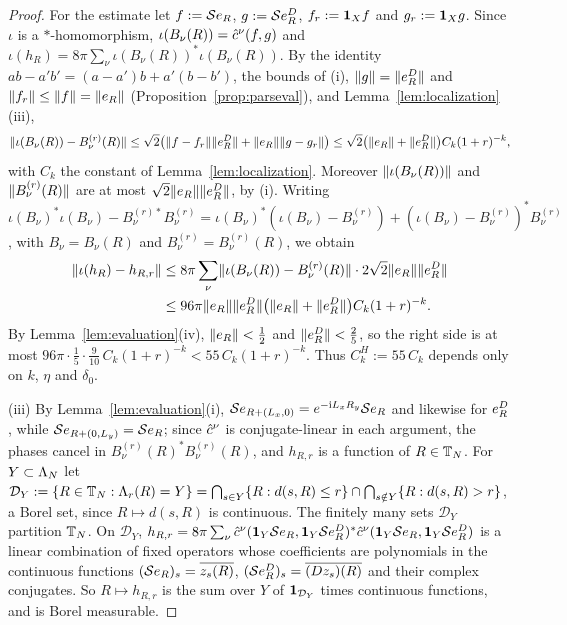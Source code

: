 \begin{proof}
For the estimate let $f:=\mathcal{S}e_{R}$, $g:=\mathcal{S}e^{D}_{R}$, $f_r:=\mathbf{1}_Xf$ and $g_r:=\mathbf{1}_Xg$. Since $\iota$ is a
$*$-homomorphism, $\iota(B_\nu(R))=\hat{c}^{\nu}(f,g)$ and $\iota(h_R)=8\pi\sum_\nu\iota(B_\nu(R))^*\iota(B_\nu(R))$. By the
identity $ab-a'b'=(a-a')b+a'(b-b')$, the bounds of (i), $\lVert g\rVert=\lVert e^{D}_{R}\rVert$ and $\lVert f_r\rVert\le\lVert f\rVert=\lVert e_{R}\rVert$
(Proposition~\ref{prop:parseval}), and Lemma~\ref{lem:localization}(iii),
\[
\lVert\iota(B_\nu(R))-B^{(r)}_\nu(R)\rVert\le\sqrt2\bigl(\lVert f-f_r\rVert\lVert e^{D}_{R}\rVert+\lVert e_{R}\rVert\lVert g-g_r\rVert\bigr)
\le\sqrt2\bigl(\lVert e_{R}\rVert+\lVert e^{D}_{R}\rVert\bigr)C_k(1+r)^{-k},
\]
with $C_k$ the constant of Lemma~\ref{lem:localization}. Moreover $\lVert\iota(B_\nu(R))\rVert$ and $\lVert B^{(r)}_\nu(R)\rVert$ are at
most $\sqrt2\lVert e_{R}\rVert\lVert e^{D}_{R}\rVert$, by (i). Writing
$\iota(B_\nu)^*\iota(B_\nu)-B^{(r)*}_\nu B^{(r)}_\nu=\iota(B_\nu)^*(\iota(B_\nu)-B^{(r)}_\nu)+(\iota(B_\nu)-B^{(r)}_\nu)^*B^{(r)}_\nu$, with
$B_\nu=B_\nu(R)$ and $B^{(r)}_\nu=B^{(r)}_\nu(R)$, we obtain
\begin{align*}
\lVert\iota(h_R)-h_{R,r}\rVert&\le8\pi\sum_\nu\lVert\iota(B_\nu(R))-B^{(r)}_\nu(R)\rVert\cdot2\sqrt2\lVert e_{R}\rVert\lVert e^{D}_{R}\rVert\\
&\le96\pi\lVert e_{R}\rVert\lVert e^{D}_{R}\rVert\bigl(\lVert e_{R}\rVert+\lVert e^{D}_{R}\rVert\bigr)C_k(1+r)^{-k}.
\end{align*}
By Lemma~\ref{lem:evaluation}(iv), $\lVert e_{R}\rVert<\frac12$ and $\lVert e^{D}_{R}\rVert<\frac25$, so the right side is at most
$96\pi\cdot\frac15\cdot\frac9{10}\,C_k(1+r)^{-k}<55\,C_k(1+r)^{-k}$. Thus $C^H_k:=55\,C_k$ depends only on $k$, $\eta$ and
$\delta_0$.

(iii) By Lemma~\ref{lem:evaluation}(i), $\mathcal{S}e_{R+(L_x,0)}=e^{-\mathrm{i} L_xR_y}\mathcal{S}e_{R}$ and likewise for $e^{D}_{R}$, while
$\mathcal{S}e_{R+(0,L_y)}=\mathcal{S}e_{R}$; since $\hat{c}^{\nu}$ is conjugate-linear in each argument, the phases cancel in
$B^{(r)}_\nu(R)^*B^{(r)}_\nu(R)$, and $h_{R,r}$ is a function of $R\in\mathbb{T}_N$. For $Y\subset\Lambda_N$ let
$\mathcal D_Y:=\{R\in\mathbb{T}_N:\Lambda_{r}(R)=Y\}=\bigcap_{s\in Y}\{R:d(s,R)\le r\}\cap\bigcap_{s\notin Y}\{R:d(s,R)>r\}$, a Borel set,
since $R\mapsto d(s,R)$ is continuous. The finitely many sets $\mathcal D_Y$ partition $\mathbb{T}_N$. On $\mathcal D_Y$,
$h_{R,r}=8\pi\sum_\nu\hat{c}^{\nu}(\mathbf{1}_Y\mathcal{S}e_{R},\mathbf{1}_Y\mathcal{S}e^{D}_{R})^*\hat{c}^{\nu}(\mathbf{1}_Y\mathcal{S}e_{R},\mathbf{1}_Y\mathcal{S}e^{D}_{R})$ is a linear
combination of fixed operators whose coefficients are polynomials in the continuous functions
$(\mathcal{S}e_{R})_s=\overline{z_s(R)}$, $(\mathcal{S}e^{D}_{R})_s=\overline{(Dz_s)(R)}$ and their complex conjugates. So
$R\mapsto h_{R,r}$ is the sum over $Y$ of $\mathbf{1}_{\mathcal D_Y}$ times continuous functions, and is Borel measurable.
\end{proof}

